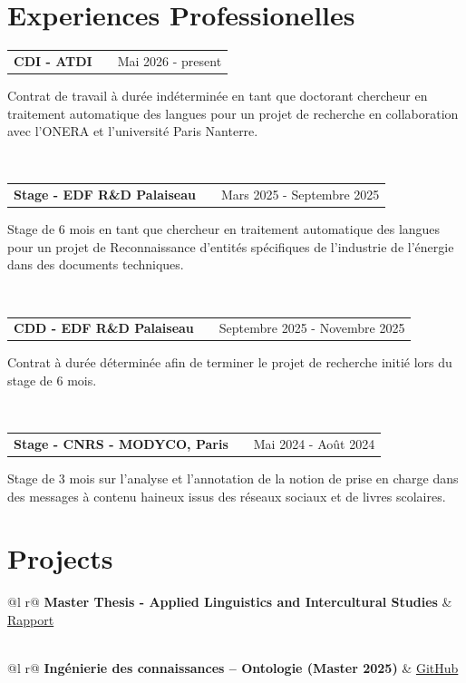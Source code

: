 \documentclass[a4paper,12pt]{article}
\makeatletter
\newenvironment{jobshort}[2]
    {
    \begin{tabularx}{\linewidth}{@{}l X r@{}}
    \textbf{#1} & \hfill &  #2 \\[3.75pt]
    \end{tabularx}
    }
    {
    }
\makeatother
\begin{document}
\section{Experiences Professionelles}

\begin{jobshort}{CDI - ATDI}{Mai 2026 - present}
Contrat de travail à durée indéterminée en tant que doctorant chercheur en traitement automatique des langues pour un projet de recherche en collaboration avec l'ONERA et l'université Paris Nanterre. 
\end{jobshort}\

\begin{jobshort}{Stage - EDF R\&D Palaiseau}{Mars 2025 - Septembre 2025}
Stage de 6 mois en tant que chercheur en traitement automatique des langues pour un projet de Reconnaissance d'entités spécifiques de l'industrie de l'énergie dans des documents techniques.
\end{jobshort}\

\begin{jobshort}{CDD - EDF R\&D Palaiseau}{Septembre 2025 - Novembre 2025}
Contrat à durée déterminée afin de terminer le projet de recherche initié lors du stage de 6 mois. 
\end{jobshort}\

\begin{jobshort}{Stage - CNRS - MODYCO, Paris}{Mai 2024 - Août 2024}
Stage de 3 mois sur l'analyse et l'annotation de la notion de prise en charge dans des messages à contenu haineux issus des réseaux sociaux et de livres scolaires.
\end{jobshort}

\section{Projects}

\begin{tabularx}{\linewidth}{ @{}l r@{} }
\textbf{Master Thesis - Applied Linguistics and Intercultural Studies} & \hfill \href{https://github.com/ASVienot/MasterThesis_Anglicisms_in_French_Medias}{Rapport} \\[3.75pt]
  \\
\end{tabularx}


\begin{tabularx}{\linewidth}{ @{}l r@{} }
\textbf{Ingénierie des connaissances -- Ontologie (Master 2025)}
& \hfill \href{https://github.com/ASVienot/ontologie_masterTAL}{GitHub} \\[3.75pt]
 \\
\end{tabularx}
\end{document}
